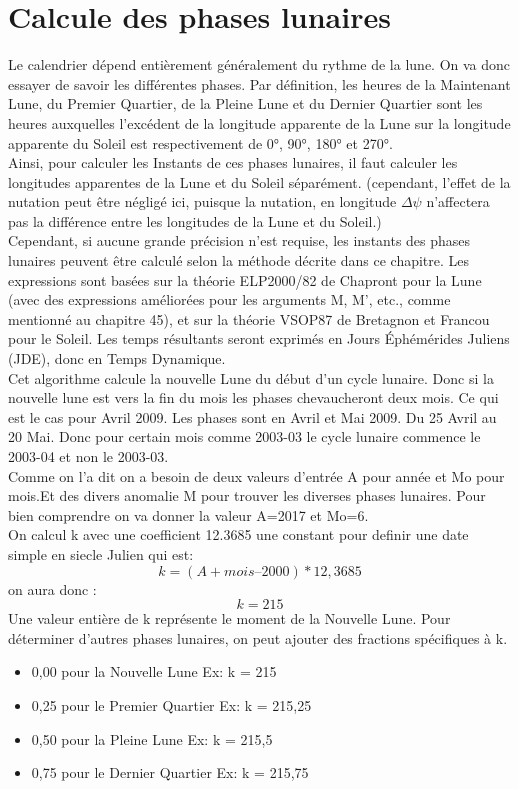 \section{Calcule des phases lunaires}
Le calendrier dépend entièrement généralement du rythme de la lune. On va donc essayer de savoir les différentes phases.
Par définition, les heures de la Maintenant Lune, du Premier Quartier, de la Pleine Lune et du Dernier
Quartier sont les heures auxquelles l'excédent de la longitude apparente de la Lune sur la longitude apparente
du Soleil est respectivement de 0°, 90°, 180° et 270°.\\
Ainsi, pour calculer les Instants de ces phases lunaires, il faut calculer les
longitudes apparentes de la Lune et du Soleil séparément. (cependant, l'effet de la nutation peut
être négligé ici, puisque la nutation, en longitude $\Delta\psi$ n'affectera pas la différence entre les longitudes
de la Lune et du Soleil.)\\
Cependant, si aucune grande précision n'est requise, les instants des phases lunaires peuvent être
calculé selon la méthode décrite dans ce chapitre. Les expressions sont basées sur la théorie
ELP­2000/82 de Chapront pour la Lune (avec des expressions améliorées pour les arguments M,
M', etc., comme mentionné au chapitre 45), et sur la théorie VSOP87 de Bretagnon et Francou
pour le Soleil. Les temps résultants seront exprimés en Jours Éphémérides Juliens (JDE), donc en
Temps Dynamique.\\
Cet algorithme calcule la nouvelle Lune du début d’un cycle lunaire. Donc si la nouvelle lune est vers la fin du mois les phases chevaucheront deux mois. Ce qui est le cas pour Avril 2009. Les phases sont en Avril et Mai 2009.  Du 25 Avril au 20 Mai. Donc pour certain mois comme 2003-03 le cycle lunaire commence le 2003-04 et non le 2003-03.\\
Comme on l’a dit on a besoin de deux valeurs d’entrée A pour année et Mo pour mois.Et des divers anomalie M pour trouver les diverses phases lunaires. Pour bien comprendre on va donner la valeur A=2017 et Mo=6. \\
On calcul k avec une coefficient 12.3685 une constant pour definir une date simple en siecle Julien  qui est:
\[k = (A+ mois – 2000)*12,3685\]
on aura donc :
\[k =215\]
Une valeur entière de k représente le moment de la Nouvelle Lune. Pour déterminer d'autres phases lunaires, on peut ajouter des fractions spécifiques à k. 
\begin{itemize}    
\item[]0,00 pour la Nouvelle Lune Ex:  k = 215
\item[]0,25 pour le Premier Quartier Ex: k = 215,25
\item[]0,50 pour la Pleine Lune Ex: k = 215,5
\item[]0,75 pour le Dernier Quartier Ex: k = 215,75
\end{itemize}
